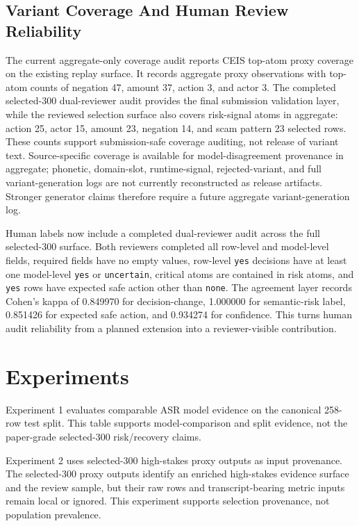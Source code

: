 \documentclass[
]{article}
\begin{document}
\hypertarget{variant-coverage-and-human-review-reliability}{%
\subsection{Variant Coverage And Human Review
Reliability}\label{variant-coverage-and-human-review-reliability}}

The current aggregate-only coverage audit reports CEIS top-atom proxy
coverage on the existing replay surface. It records aggregate proxy
observations with top-atom counts of negation 47, amount 37, action 3,
and actor 3. The completed selected-300 dual-reviewer audit provides the
final submission validation layer, while the reviewed selection surface
also covers risk-signal atoms in aggregate: action 25, actor 15, amount
23, negation 14, and scam pattern 23 selected rows. These counts support
submission-safe coverage auditing, not release of variant text.
Source-specific coverage is available for model-disagreement provenance
in aggregate; phonetic, domain-slot, runtime-signal, rejected-variant,
and full variant-generation logs are not currently reconstructed as
release artifacts. Stronger generator claims therefore require a future
aggregate variant-generation log.

Human labels now include a completed dual-reviewer audit across the full
selected-300 surface. Both reviewers completed all row-level and
model-level fields, required fields have no empty values, row-level
\texttt{yes} decisions have at least one model-level \texttt{yes} or
\texttt{uncertain}, critical atoms are contained in risk atoms, and
\texttt{yes} rows have expected safe action other than \texttt{none}.
The agreement layer records Cohen's kappa of 0.849970 for
decision-change, 1.000000 for semantic-risk label, 0.851426 for
expected safe action, and 0.934274 for confidence. This turns human
audit reliability from a planned extension into a reviewer-visible
contribution.

\hypertarget{experiments}{%
\section{Experiments}\label{experiments}}

Experiment 1 evaluates comparable ASR model evidence on the canonical
258-row test split. This table supports model-comparison and split
evidence, not the paper-grade selected-300 risk/recovery claims.

Experiment 2 uses selected-300 high-stakes proxy outputs as input
provenance. The selected-300 proxy outputs identify an enriched
high-stakes evidence surface and the review sample, but their raw rows
and transcript-bearing metric inputs remain local or ignored. This
experiment supports selection provenance, not population prevalence.
\end{document}
